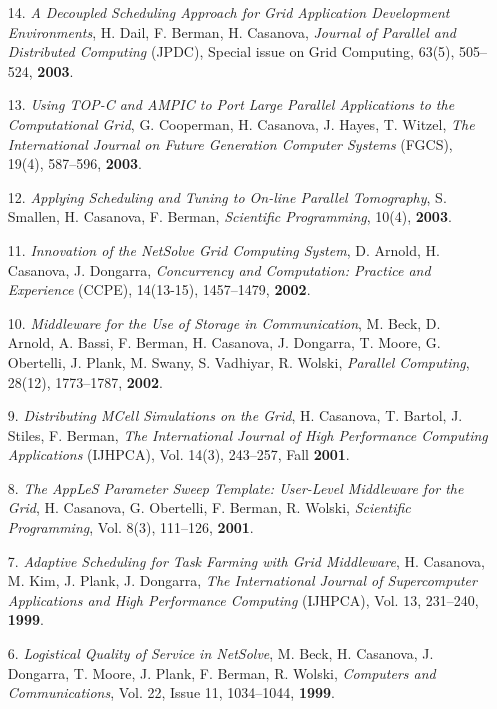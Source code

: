 \begin{enumerate}
\item [14.]
{\it A Decoupled Scheduling Approach for Grid Application Development
Environments}, H. Dail, F. Berman, H. Casanova, \emph{Journal of Parallel
and Distributed Computing} (JPDC), Special issue on Grid Computing,
63(5), 505--524, {\bf 2003}.

\item[13.]
{\it Using TOP-C and AMPIC to Port Large Parallel Applications to the
Computational Grid}, G. Cooperman, H. Casanova, J. Hayes, T. Witzel,
\emph{The International Journal on Future Generation Computer Systems}
(FGCS), 19(4), 587--596, {\bf 2003}.  

\item[12.]
{\it Applying Scheduling and Tuning to On-line Parallel Tomography},
S. Smallen, H. Casanova, F. Berman, \emph{Scientific Programming},
10(4), {\bf 2003}. 

\item[11.]
{\it Innovation of the NetSolve Grid Computing System}, D. Arnold,
H. Casanova, J. Dongarra, \emph{Concurrency and Computation: Practice
and Experience} (CCPE), 14(13-15), 1457--1479, {\bf 2002}. 

\item[10.]
{\it Middleware for the Use of Storage in Communication}, M. Beck,
D. Arnold, A. Bassi, F. Berman, H. Casanova, J. Dongarra, T. Moore,
G. Obertelli, J. Plank, M. Swany, S. Vadhiyar, R. Wolski, \emph{Parallel
Computing}, 28(12), 1773--1787, {\bf 2002}.

\item[9.]
{\it Distributing MCell Simulations on the Grid}, H. Casanova, T. Bartol,
J. Stiles, F. Berman, \emph{The International Journal of High Performance
Computing Applications} (IJHPCA), Vol. 14(3), 243--257, Fall {\bf 2001}.

\item[8.]
{\it The AppLeS Parameter Sweep Template: User-Level Middleware for the
Grid}, H. Casanova, G. Obertelli, F. Berman, R. Wolski, \emph{Scientific
Programming}, Vol. 8(3), 111--126, {\bf 2001}.  

\item[7.]
{\it Adaptive Scheduling for Task Farming with Grid Middleware},
H. Casanova, M. Kim, J. Plank, J. Dongarra, \emph{The International
Journal of Supercomputer Applications and High Performance Computing}
(IJHPCA), Vol. 13, 231--240, {\bf 1999}.

\item[6.]
{\it Logistical Quality of Service in NetSolve}, M. Beck, H. Casanova,
J. Dongarra, T. Moore, J. Plank, F. Berman, R. Wolski, \emph{Computers
and Communications}, Vol. 22, Issue 11, 1034--1044, {\bf 1999}.


\end{enumerate}
